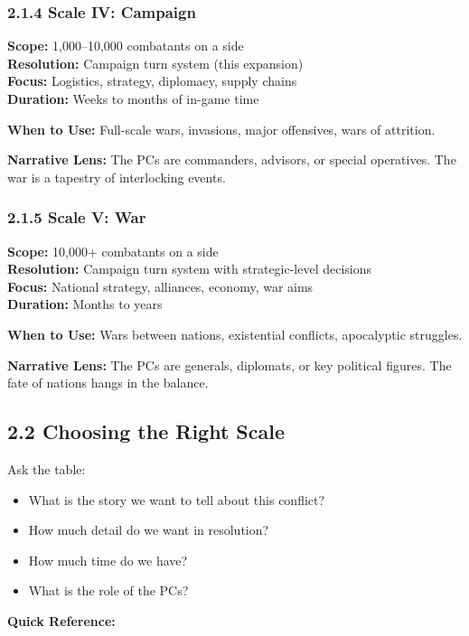 \documentclass[11pt]{article}
\begin{document}
\subsubsection{2.1.4 Scale IV: Campaign}

\textbf{Scope:} 1,000–10,000 combatants on a side\\
\textbf{Resolution:} Campaign turn system (this expansion)\\
\textbf{Focus:} Logistics, strategy, diplomacy, supply chains\\
\textbf{Duration:} Weeks to months of in-game time

\textbf{When to Use:} Full-scale wars, invasions, major offensives, wars of attrition.

\textbf{Narrative Lens:} The PCs are commanders, advisors, or special operatives. The war is a tapestry of interlocking events.

\subsubsection{2.1.5 Scale V: War}

\textbf{Scope:} 10,000+ combatants on a side\\
\textbf{Resolution:} Campaign turn system with strategic-level decisions\\
\textbf{Focus:} National strategy, alliances, economy, war aims\\
\textbf{Duration:} Months to years

\textbf{When to Use:} Wars between nations, existential conflicts, apocalyptic struggles.

\textbf{Narrative Lens:} The PCs are generals, diplomats, or key political figures. The fate of nations hangs in the balance.

\subsection{2.2 Choosing the Right Scale}

Ask the table:
\begin{itemize}
  \item What is the story we want to tell about this conflict?
  \item How much detail do we want in resolution?
  \item How much time do we have?
  \item What is the role of the PCs?
\end{itemize}

\textbf{Quick Reference:}
\end{document}

